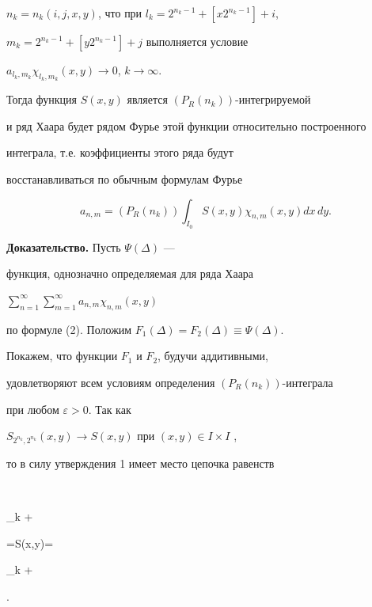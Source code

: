 \begin{thm}
\begin{itemize}
$n_k=n_{k}(i,j,x,y)$, что при $l_k=2^{n_k-1}+[x2^{n_k-1}]+i$, 


$m_k=2^{n_k-1}+[y2^{n_k-1}]+j$ выполняется условие 


$a_{l_k,m_k}\chi_{l_k,m_k}(x,y) \to 0$, $k \to \infty$. 


\end{itemize}





Тогда функция $S(x,y)$ является $(P_{R}(n_{k})) $-интегрируемой 


и ряд Хаара будет рядом Фурье этой функции относительно построенного 


интеграла, т.е. коэффициенты этого ряда будут 


восстанавливаться по обычным формулам Фурье 


$$


a_{n,m}=(P_{R}(n_{k}))\int_{I_{0}}S(x,y)\chi_{n,m}(x,y)dx\,dy.


$$ 


\end{thm}


 


{\bf Доказательство.} Пусть $\Psi(\Delta)$ --- 


функция, однозначно определяемая для ряда Хаара 


$\sum\limits _{n=1}^{\infty }\sum\limits _{m=1}^{\infty }


a_{n,m}\chi _{n,m}(x,y)$


по формуле (2). Положим $F_1(\Delta)=


F_2(\Delta)\equiv \Psi(\Delta)$. 


Покажем, что функции $F_1$ и $F_2$, будучи аддитивными, 


удовлетворяют всем условиям определения $(P_{R}(n_k))$-интеграла 


при любом $\varepsilon>0$. Так как 


$S_{2^{n_k},2^{n_k}}(x,y)\to S(x,y)$ при $(x,y)\in I\times I$ , 


то в силу утверждения 1 имеет место цепочка равенств 


$$


\lim\limits_{k \to + \infty}


\displaystyle{}=S(x,y)=


\lim\limits_{k \to + \infty}


\displaystyle{}.


